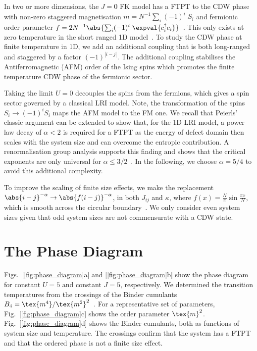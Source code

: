 In two or more dimensions, the \(J\!=0\!\) \ac{FK} model has a \ac{FTPT} to the \ac{CDW} phase with non-zero staggered magnetisation \(m = N^{-1} \sum_i (-1)^i \; S_i\) and fermionic order parameter \(f = 2 N^{-1}\abs{\sum_i (-1)^i \; \expval{c^\dag_{i}c_{i}}}\)~\cite{antipovInteractionTunedAndersonMott2016,maskaThermodynamicsTwodimensionalFalicovKimball2006}. This only exists at zero temperature in the short ranged 1D model~\cite{kennedyItinerantElectronModel1986}. To study the \ac{CDW} phase at finite temperature in 1D, we add an additional coupling that is both long-ranged and staggered by a factor \((-1)^{|i-j|}\). The additional coupling stabilises the Antiferromagnetic (AFM) order of the Ising spins which promotes the finite temperature \ac{CDW} phase of the fermionic sector.

Taking the limit \(U = 0\) decouples the spins from the fermions, which gives a spin sector governed by a classical \ac{LRI} model. Note, the transformation of the spins \(S_i \to (-1)^{i} S_i\) maps the AFM model to the FM one. We recall that Peierls' classic argument can be extended to show that, for the 1D \ac{LRI} model, a power law decay of \(\alpha < 2\) is required for a \ac{FTPT} as the energy of defect domain then scales with the system size and can overcome the entropic contribution. A renormalisation group analysis supports this finding and shows that the critical exponents are only universal for \(\alpha \leq 3/2\)~\cite{ruelleStatisticalMechanicsOnedimensional1968,thoulessLongRangeOrderOneDimensional1969,angeliniRelationsShortrangeLongrange2014}. In the following, we choose \(\alpha = 5/4\) to avoid this additional complexity. 

To improve the scaling of finite size effects, we make the replacement \( \abs{i - j}^{-\alpha} \rightarrow \abs{f(i - j)}^{-\alpha}\), in both \(J_{ij}\) and \(\kappa\), where \(f(x) = \frac{N}{\pi}\sin \frac{\pi x}{N}\), which is smooth across the circular boundary~\cite{fukuiOrderNClusterMonte2009}. We only consider even system sizes given that odd system sizes are not commensurate with a \ac{CDW} state. 


\section{The Phase Diagram} 
Figs.~[\ref{fig:phase_diagram}a] and [\ref{fig:phase_diagram}b] show the phase diagram for constant \(U=5\) and constant \(J=5\), respectively. We determined the transition temperatures from the crossings of the Binder cumulants \(B_4 = \tex{m^4}/\tex{m^2}^2\)~\cite{binderFiniteSizeScaling1981}. For a representative set of parameters, Fig.~[\ref{fig:phase_diagram}c] shows the order parameter \(\tex{m}^2\). Fig.~[\ref{fig:phase_diagram}d] shows the Binder cumulants, both as functions of system size and temperature. The crossings confirm that the system has a \ac{FTPT} and that the ordered phase is not a finite size effect. 

